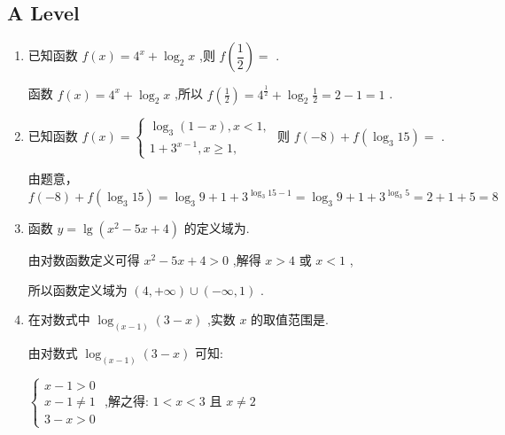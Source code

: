 \subsection*{A Level}
\begin{enumerate}
    \item 已知函数 $f\left( x\right)  = {4}^{x} + {\log }_{2}x$ ,则 $f\left( \dfrac{1}{2}\right)  =$ .
    \begin{jieda}
        函数 $f\left( x\right)  = {4}^{x} + {\log }_{2}x$ ,所以 $f\left( \frac{1}{2}\right)  = {4}^{\frac{1}{2}} + {\log }_{2}\frac{1}{2} = 2 - 1 = 1$ .
    \end{jieda}
    
    \item 已知函数 $f\left( x\right)  = \left\{  \begin{array}{l} {\log }_{3}\left( {1 - x}\right) ,x < 1, \\  1 + {3}^{x - 1},x \geq  1, \end{array}\right.$ 则 $f\left( {-8}\right)  + f\left( {{\log }_{3}{15}}\right)  =$ .
    \begin{jieda}
        由题意，$f\left( {-8}\right)  + f\left( {{\log }_{3}{15}}\right)  = {\log }_{3}9 + 1 + {3}^{{\log }_{3}{15} - 1} = {\log }_{3}9 + 1 + {3}^{{\log }_{3}5} = 2 + 1 + 5 = 8$
    \end{jieda}
    
    \item 函数 $y = \lg \left( {{x}^{2} - {5x} + 4}\right)$ 的定义域为.
    \begin{jieda}
        由对数函数定义可得 ${x}^{2} - {5x} + 4 > 0$ ,解得 $x > 4$ 或 $x < 1$ ,
        
        所以函数定义域为 $\left( {4, + \infty }\right)  \cup  \left( {-\infty ,1}\right)$ .
    \end{jieda}
    \item 在对数式中 ${\log }_{\left( x - 1\right) }\left( {3 - x}\right)$ ,实数 $x$ 的取值范围是.
    \begin{jieda}
        由对数式 ${\log }_{\left( x - 1\right) }\left( {3 - x}\right)$ 可知:
        
        $\left\{  \begin{array}{l} x - 1 > 0 \\  x - 1 \neq  1 \\  3 - x > 0 \end{array}\right.$ ,解之得: $1 < x < 3$ 且 $x \neq  2$
    \end{jieda}
    

\end{enumerate}
